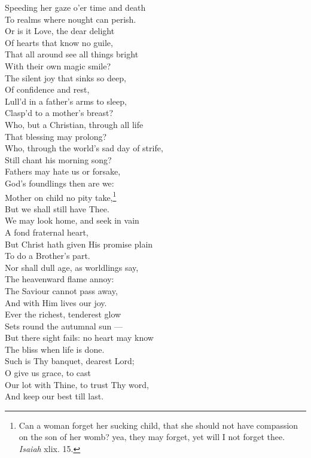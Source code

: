  Speeding her gaze o’er time and death \\
 To realms where nought can perish. \\
  Or is it Love, the dear delight \\
 Of hearts that know no guile, \\
 That all around see all things bright \\
 With their own magic smile? \\
  The silent joy that sinks so deep, \\
 Of confidence and rest, \\
 Lull’d in a father’s arms to sleep, \\
 Clasp’d to a mother’s breast? \\
  Who, but a Christian, through all life \\
 That blessing may prolong? \\
 Who, through the world’s sad day of strife, \\
 Still chant his morning song? \\
  Fathers may hate us or forsake, \\
 God’s foundlings then are we: \\
 Mother on child no pity take,\footnote{Can a woman forget her sucking child, that she should not have compassion on the son of her womb? yea, they may forget, yet will I not forget thee. \emph{Isaiah} xlix. 15.} \\
 But we shall still have Thee. \\
  We may look home, and seek in vain \\
 A fond fraternal heart, \\
 But Christ hath given His promise plain \\
 To do a Brother’s part. \\
  Nor shall dull age, as worldlings say, \\
 The heavenward flame annoy: \\
 The Saviour cannot pass away, \\
 And with Him lives our joy. \\
  Ever the richest, tenderest glow \\
 Sets round the autumnal sun — \\
 But there sight fails: no heart may know \\
 The bliss when life is done. \\
  Such is Thy banquet, dearest Lord; \\
 O give us grace, to cast \\
 Our lot with Thine, to trust Thy word, \\
 And keep our best till last.\\

